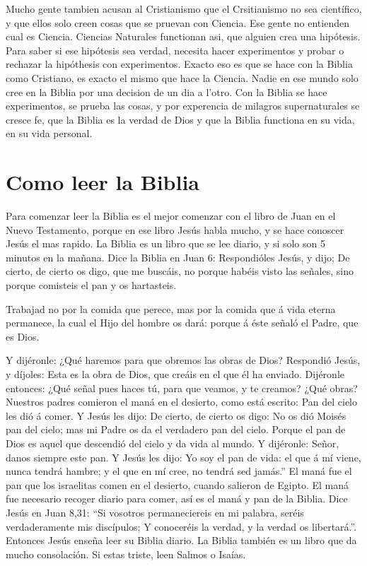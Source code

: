 Mucho gente tambien acusan al Cristianismo que el Crsitianismo no sea
científico, y que ellos solo creen cosas que se pruevan con Ciencia. Ese
gente no entienden cual es Ciencia. Ciencias Naturales functionan asi,
que alguien crea una hipótesis. Para saber si ese hipótesis sea verdad,
necesita hacer experimentos y probar o rechazar la hipóthesis con
experimentos. Exacto eso es que se hace con la Biblia como Cristiano, es
exacto el mismo que hace la Ciencia. Nadie en ese mundo solo cree en la
Biblia por una decision de un dia a l'otro. Con la Biblia se hace
experimentos, se prueba las cosas, y por experencia de milagros
supernaturales se cresce fe, que la Biblia es la verdad de Dios y que la
Biblia functiona en su vida, en su vida personal.

\hypertarget{como-leer-la-biblia}{%
\section{Como leer la Biblia}\label{como-leer-la-biblia}}

Para comenzar leer la Biblia es el mejor comenzar con el libro de Juan
en el Nuevo Testamento, porque en ese libro Jesús habla mucho, y se hace
conoscer Jesús el mas rapido. La Biblia es un libro que se lee diario, y
si solo son 5 minutos en la mañana. Dice la Biblia en Juan 6:
 Respondióles Jesús, y dijo; De cierto, de cierto os
digo, que me buscáis, no porque habéis visto las señales, sino porque
comisteis el pan y os hartasteis.

 Trabajad no por la comida que perece, mas por la comida
que á vida eterna permanece, la cual el Hijo del hombre os dará: porque
á éste señaló el Padre, que es Dios.

 Y dijéronle: ¿Qué haremos para que obremos las obras de
Dios?  Respondió Jesús, y díjoles: Esta es la obra de
Dios, que creáis en el que él ha enviado.  Dijéronle
entonces: ¿Qué señal pues haces tú, para que veamos, y te creamos? ¿Qué
obras?  Nuestros padres comieron el maná en el desierto,
como está escrito: Pan del cielo les dió á comer.  Y
Jesús les dijo: De cierto, de cierto os digo: No os dió Moisés pan del
cielo; mas mi Padre os da el verdadero pan del cielo. 
Porque el pan de Dios es aquel que descendió del cielo y da vida al
mundo.  Y dijéronle: Señor, danos siempre este pan.
 Y Jesús les dijo: Yo soy el pan de vida: el que á mí
viene, nunca tendrá hambre; y el que en mí cree, no tendrá sed jamás.''
El maná fue el pan que los israelitas comen en el desierto, cuando
salieron de Egipto. El maná fue necesario recoger diario para comer, así
es el maná y pan de la Biblia. Dice Jesús en Juan 8,31: ``Si vosotros
permaneciereis en mi palabra, seréis verdaderamente mis discípulos; Y
conoceréis la verdad, y la verdad os libertará.''. Entonces Jesús enseña
leer su Biblia diario. La Biblia también es un libro que da mucho
consolación. Si estas triste, leen Salmos o Isaías.

